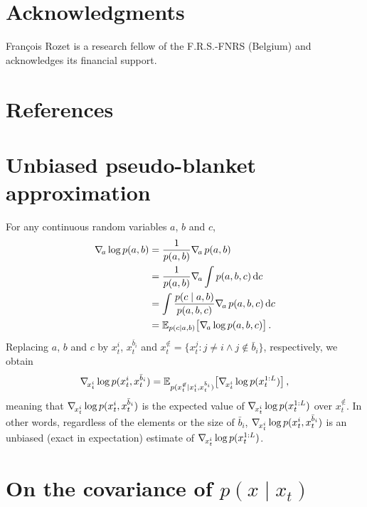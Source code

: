 \section*{Acknowledgments}

François Rozet is a research fellow of the F.R.S.-FNRS (Belgium) and acknowledges its financial support.

\clearpage
\section*{References}

\printbibliography[heading=none]

\begin{subappendices}

\clearpage
\section{Unbiased pseudo-blanket approximation} \label{app:sda-unbiased}

For any continuous random variables $a$, $b$ and $c$,
\begin{align*}
    \nabla_{\!{a}} \log p(a, b) & = \frac{1}{p(a, b)} \nabla_{\!{a}} \, p(a, b) \\
    & = \frac{1}{p(a, b)} \nabla_{\!{a}} \int p(a, b, c) \operatorname{d}\!{c} \\
    & = \int \frac{p(c \mid a, b)}{p(a, b, c)} \nabla_{\!{a}} \, p(a, b, c) \operatorname{d}\!{c} \\
    & = \mathbb{E}_{p(c \mid a, b)} \big[ \nabla_{\!{a}} \log p(a, b, c) \big] \, .
\end{align*}
Replacing $a$, $b$ and $c$ by $x^i_t$, $x^{\bar{b}_i}_t$ and $x^{\not\in}_t = \{ x^{j}_t : j \neq i \wedge j \not\in \bar{b}_i \}$, respectively, we obtain
\begin{equation*}
    \nabla_{\!{x^i_t}} \log p(x^i_t, x^{\bar{b}_i}_t) = \mathbb{E}_{p(x^{\not\in}_t \mid x^i_t, x^{\bar{b}_i}_t)} \big[ \nabla_{\!{x^i_t}} \log p(x^{1:L}_t) \big] \, ,
\end{equation*}
meaning that $\nabla_{\!{x^i_t}} \log p(x^i_t, x^{\bar{b}_i}_t)$ is the expected value of $\nabla_{\!{x^i_t}} \log p(x^{1:L}_t)$ over $x^{\not\in}_t$. In other words, regardless of the elements or the size of $\bar{b}_i$, $\nabla_{\!{x^i_t}} \log p(x^i_t, x^{\bar{b}_i}_t)$ is an unbiased (exact in expectation) estimate of $\nabla_{\!{x^i_t}} \log p(x^{1:L}_t)$.

\section{On the covariance of $p(x \mid x_t)$} \label{app:sda-covariance}


\end{subappendices}
